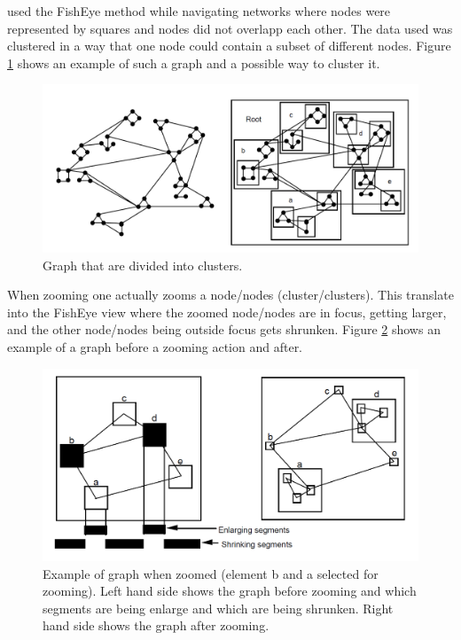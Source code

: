 \documentclass[a4paper,11pt]{kth-mag}
\begin{document}
\cite{Schaffer:1996:NHC:230562.230577} used the FishEye method while navigating networks where nodes were represented by squares and  
nodes did not overlapp each other. The data used was clustered in a way that one node could contain a subset of different nodes. Figure \ref{fig:FishEyeCluster} shows an example of such a graph and a 
possible way to cluster it.

\begin{figure}[!htbp]
	\centering
	\includegraphics[scale=0.3]{FishEyeCluster}
	\caption{Graph that are divided into clusters.}
	\label{fig:FishEyeCluster}
\end{figure}

When zooming one actually zooms a node/nodes (cluster/clusters). This translate into the FishEye view where the zoomed node/nodes are in focus, getting larger, and the
other node/nodes being outside focus gets shrunken. Figure \ref{fig:FishEyeZoom} shows an example of a graph before a zooming action and after.

\begin{figure}[!htbp]
	\centering
	\includegraphics[scale=0.3]{FishEyeZoom}
	\caption{Example of graph when zoomed (element b and a selected for zooming). Left hand side shows the graph before zooming and which segments are being enlarge and which are being shrunken. Right hand side shows the graph after zooming.}
	\label{fig:FishEyeZoom}
\end{figure}
\newpage
\end{document}
